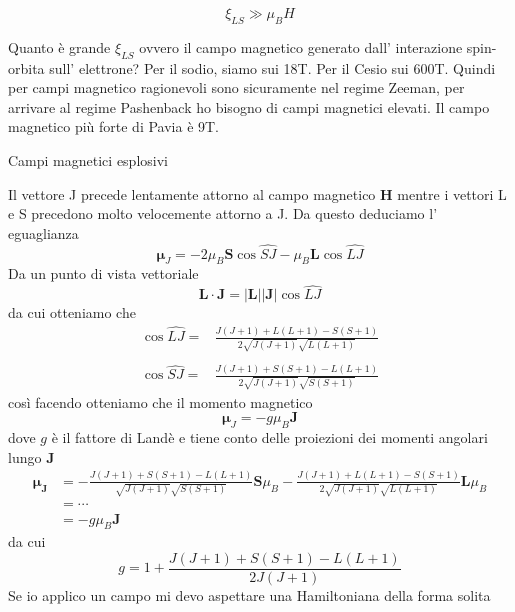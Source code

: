 \begin{equation*}
  \xi_{LS} \gg \mu_B H
\end{equation*}
\begin{greenbox}{}
  Quanto è grande $\xi_{LS}$ ovvero il campo magnetico generato dall' interazione spin-orbita sull' elettrone?
  Per il sodio, siamo sui 18T. Per il Cesio sui 600T. Quindi per campi magnetico ragionevoli sono sicuramente nel regime Zeeman, per arrivare al regime Pashenback ho bisogno di campi magnetici elevati. Il campo magnetico più forte di Pavia è 9T. 
\end{greenbox}
\begin{deepbox}{Campi magnetici esplosivi}
\end{deepbox}
Il vettore J precede lentamente attorno al campo magnetico $\bm{H}$ mentre i vettori L e S precedono molto velocemente attorno a J. Da questo deduciamo l' eguaglianza
\begin{equation*}
  \bm{\mu}_J = -2 \mu_B \bm{S} \cos \widehat{SJ} - \mu_B \bm{L}\cos \widehat{LJ}
\end{equation*}
Da un punto di vista vettoriale
\begin{equation*}
  \bm{L\cdot J} = |\bm{L}||\bm{J}| \cos \widehat{LJ}
\end{equation*}
da cui otteniamo che
\begin{align*}
  \cos \widehat{LJ} =& \frac{J(J+1)+L(L+1)-S(S+1)}{2\sqrt{J(J+1)}\sqrt{L(L+1)}} \\\\
  \cos \widehat{SJ} =& \frac{J(J+1)+S(S+1)-L(L+1)}{2\sqrt{J(J+1)}\sqrt{S(S+1)}} 
\end{align*}
così facendo otteniamo che il momento magnetico 
\begin{equation*}
  \bm{\mu}_J = - g \mu_B \bm{J}
\end{equation*}
dove $g$ è il fattore di Landè e tiene conto delle proiezioni dei momenti angolari lungo $\bm{J}$
\begin{align*}
  \bm{\mu_J} &= - \frac{J(J+1)+S(S+1)-L(L+1)}{\sqrt{J(J+1)}\sqrt{S(S+1)}} \bm{S}\mu_B - \frac{J(J+1)+L(L+1)-S(S+1)}{2\sqrt{J(J+1)}\sqrt{L(L+1)}} \bm{L}\mu_B\\
             &= \cdots \\
             &= -g \mu_B \bm{J}
\end{align*}
da cui
\begin{equation*}
  g = 1 + \frac{J(J+1)+S(S+1)-L(L+1)}{2J(J+1)}
\end{equation*}
Se io applico un campo mi devo aspettare una Hamiltoniana della forma solita
